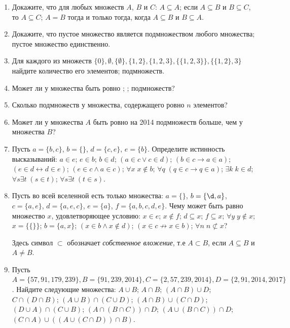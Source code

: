 \begin{enumerate}
\item Докажите, что для любых множеств $A$, $B$ и $C$:
\ipunkt $A \subseteq A$;
\ipunkt если $A \subseteq B$ и $B \subseteq C$, то $A \subseteq C$;
\ipunkt $A = B$ тогда и только тогда, когда $A \subseteq B$ и $B \subseteq A$.

\item Докажите, что
\ipunkt пустое множество является подмножеством любого множества;
\ipunkt пустое множество единственно.

\item Для каждого из множеств $\{0\}, \emptyset, \{\emptyset\}, \{1, 2\}, \{1, 2, 3\}, \{\{1, 2, 3\}\}, \{\{1, 2\}, 3\}$ найдите количество его \ipunkt элементов; \ipunkt подмножеств.


\item Может ли у множества быть ровно ; ;  подмножеств?

\item Сколько подмножеств у множества, содержащего ровно $n$ элементов?

\item Может ли у множества $A$ быть ровно на 2014 подмножеств больше, чем у множества $B$?

\item Пусть $a=\{b,c\}$, $b=\{\}$, $d=\{c,e\}$, $e=\{b\}$. Определите истинность высказываний:
\ipunkt $a\in e$;
\ipunkt $e\in b$;
\ipunkt $b\in d$;
\ipunkt $(a\in c\lor c\in d)$;
\ipunkt $(b\in c\to a\in a)$;
\ipunkt $(e\in d\leftrightarrow d\in e)$;
\ipunkt $(e\in c\land a\in c)$;
\ipunkt $\forall x\; x\notin b$;
\ipunkt $\forall q\;(q\in c\to q\in a)$;
\ipunkt $\exists k\; k\in d$;
\ipunkt $\forall s\exists t\;(s\in t)$;
\ipunkt $\forall s\exists t\;(t\in s)$.

\item Пусть во всей вселенной есть только множества: $a=\{\}$, $b=\{\d,a\}$, $c=\{a,e\}$, $d=\{a,e,c\}$, $e=\{a\}$, $f=\{a,b,c,d,e\}$. Чему может быть равно множество $x$, удовлетворяющее условию:
\ipunkt $x\in e$;
\ipunkt $x\notin f$;
\ipunkt $d\subseteq x$;
\ipunkt $f\subseteq x$;
\ipunkt $\forall y\; y\notin x$;
\ipunkt $x=\{\{\}\}$;
\ipunkt $b=\{a,x\}$;
\ipunkt $(x\in b\land x\notin d)$;
\ipunkt $(x\in c\not\to x\in b)$;
\ipunkt $\forall n\;n\not\subset x$?

Здесь символ $\subset$ обозначает \textit{собственное вложение}, т.е $A\subset B$, если $A\subseteq B$ и $A\ne B$.

\item \label{zadacha7}Пусть $A = \{57, 91, 179, 239\}, B = \{91, 239, 2014\}, C = \{2, 57, 239, 2014\}, D = \{2, 91, 2014, 2017\}$. Найдите следующие множества:
\ipunkt $A \cup B$;
\ipunkt $A \cap B$;
\ipunkt $(A \cap B) \cup D$;
\ipunkt $C \cap (D \cap B)$;
\ipunkt $(A \cup B) \cap (C \cup D)$;
\ipunkt $(A \cap B) \cup (C \cap D)$;
\ipunkt $(D \cup A) \cap (C \cup B)$;
\ipunkt $(A \cap (B \cap C)) \cap D$;
\ipunkt $(A \cup (B \cap C)) \cap D$;
\ipunkt $(C \cap A) \cup ((A \cup (C \cap D)) \cap B)$.


\end{enumerate}
